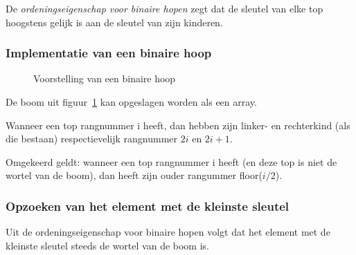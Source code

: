 \documentclass[a4paper,12pt]{article}
\begin{document}
De \textit{ordeningseigenschap voor binaire hopen} zegt dat de
sleutel van elke top hoogstens gelijk is aan de sleutel van zijn kinderen.

\subsubsection{Implementatie van een binaire hoop}
\begin{figure}[H]
\centering
{}
\caption{Voorstelling van een binaire hoop}
\label{fig:voorstellingBinaireHoop}
\end{figure}
De boom uit figuur~\ref{fig:voorstellingBinaireHoop} kan opgeslagen worden als een array.

Wanneer een top rangnummer i heeft, dan hebben zijn linker- en
rechterkind (als die bestaan) respectievelijk rangnummer $2i$ en $2i + 1$.

Omgekeerd geldt: wanneer een top rangnummer i heeft (en deze top is niet de wortel van de boom), dan heeft zijn ouder rangummer floor($i/2$).

\subsubsection{Opzoeken van het element met de kleinste sleutel}
Uit de ordeningseigenschap voor binaire hopen volgt dat het element met de kleinste sleutel steeds de wortel van de boom is.
\end{document}
